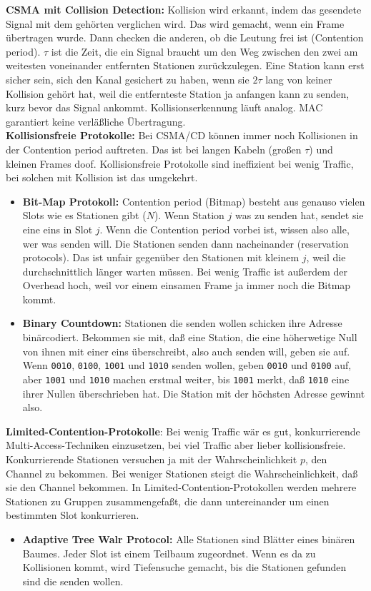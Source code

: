 \documentclass[10pt,a4paper]{scrartcl}
\begin{document}
\textbf{CSMA mit Collision Detection:} Kollision wird erkannt, indem das gesendete Signal mit dem gehörten verglichen wird. Das wird gemacht, wenn ein Frame übertragen wurde. Dann checken die anderen, ob die Leutung frei ist (Contention period). $\tau$ ist die Zeit, die ein Signal braucht um den Weg zwischen den zwei am weitesten voneinander entfernten Stationen zurückzulegen. Eine Station kann erst sicher sein, sich den Kanal gesichert zu haben, wenn sie $2\tau$ lang von keiner Kollision gehört hat, weil die entfernteste Station ja anfangen kann zu senden, kurz bevor das Signal ankommt. Kollisionserkennung läuft analog. MAC garantiert keine verläßliche Übertragung.\\
\textbf{Kollisionsfreie Protokolle:} Bei CSMA/CD können immer noch Kollisionen in der Contention period auftreten. Das ist bei langen Kabeln (großen $\tau$) und kleinen Frames doof. Kollisionsfreie Protokolle sind ineffizient bei wenig Traffic, bei solchen mit Kollision ist das umgekehrt.
\begin{itemize}
\item \textbf{Bit-Map Protokoll:} Contention period (Bitmap) besteht aus genauso vielen Slots wie es Stationen gibt ($N$). Wenn Station $j$ was zu senden hat, sendet sie eine eins in Slot $j$. Wenn die Contention period vorbei ist, wissen also alle, wer was senden will. Die Stationen senden dann nacheinander (reservation protocols). Das ist unfair gegenüber den Stationen mit kleinem $j$, weil die durchschnittlich länger warten müssen. Bei wenig Traffic ist außerdem der Overhead hoch, weil vor einem einsamen Frame ja immer noch die Bitmap kommt. 
\item \textbf{Binary Countdown:} Stationen die senden wollen schicken ihre Adresse binärcodiert. Bekommen sie mit, daß eine Station, die eine höherwetige Null von ihnen mit einer eins überschreibt, also auch senden will, geben sie auf. Wenn \texttt{0010}, \texttt{0100}, \texttt{1001} und \texttt{1010} senden wollen, geben \texttt{0010} und \texttt{0100} auf, aber  \texttt{1001} und \texttt{1010} machen erstmal weiter, bis \texttt{1001} merkt, daß \texttt{1010} eine ihrer Nullen überschrieben hat. Die Station mit der höchsten Adresse gewinnt also. 
\end{itemize}

\textbf{Limited-Contention-Protokolle}: Bei wenig Traffic wär es gut, konkurrierende Multi-Access-Techniken einzusetzen, bei viel Traffic aber lieber kollisionsfreie. Konkurrierende Stationen versuchen ja mit der Wahrscheinlichkeit $p$, den Channel zu bekommen. Bei weniger Stationen steigt die Wahrscheinlichkeit, daß sie den Channel bekommen. In Limited-Contention-Protokollen werden mehrere Stationen zu Gruppen zusammengefaßt, die dann untereinander um einen bestimmten Slot konkurrieren.
\begin{itemize}
\item \textbf{Adaptive Tree Walr Protocol:} Alle Stationen sind Blätter eines binären Baumes. Jeder Slot ist einem Teilbaum zugeordnet. Wenn es da zu Kollisionen kommt, wird Tiefensuche gemacht, bis die Stationen gefunden sind die senden wollen.
\end{itemize}
\end{document}
